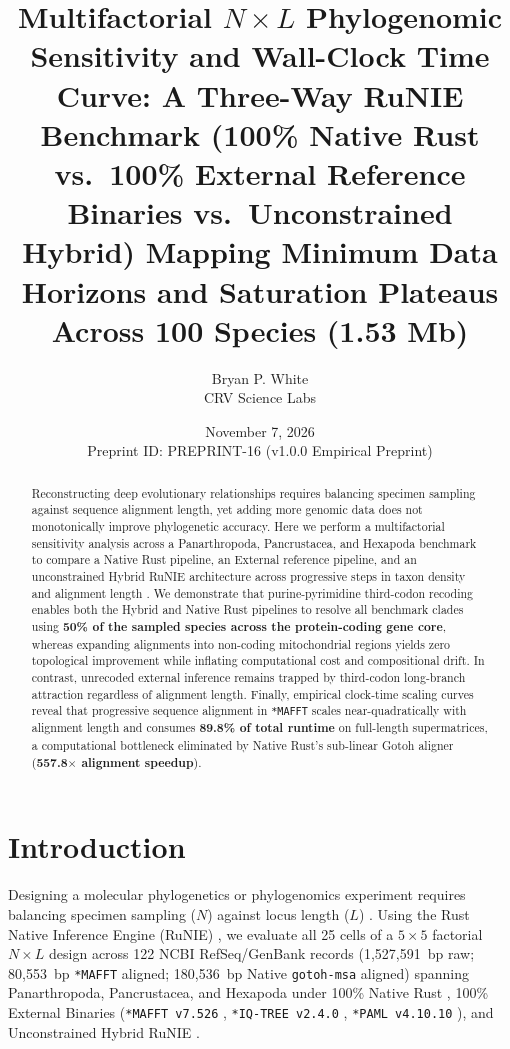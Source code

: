 \documentclass[10pt,letterpaper]{article}
\title{\textbf{Multifactorial $N \times L$ Phylogenomic Sensitivity and Wall-Clock Time Curve: A Three-Way RuNIE Benchmark (100\% Native Rust vs.\ 100\% External Reference Binaries vs.\ Unconstrained Hybrid) Mapping Minimum Data Horizons and Saturation Plateaus Across 100 Species (1.53 Mb)}}
\author{Bryan P. White \\ CRV Science Labs}
\date{November 7, 2026 \\ \small Preprint ID: PREPRINT-16 (v1.0.0 Empirical Preprint)}
\begin{document}
\maketitle

\begin{abstract}
Reconstructing deep evolutionary relationships requires balancing specimen sampling against sequence alignment length, yet adding more genomic data does not monotonically improve phylogenetic accuracy. Here we perform a multifactorial sensitivity analysis across a Panarthropoda, Pancrustacea, and Hexapoda benchmark to compare a Native Rust pipeline, an External reference pipeline, and an unconstrained Hybrid RuNIE architecture across progressive steps in taxon density and alignment length \cite{White2026RuNIE,White2026Pancrustacea}. We demonstrate that purine-pyrimidine third-codon recoding enables both the Hybrid and Native Rust pipelines to resolve all benchmark clades using \textbf{50\% of the sampled species across the protein-coding gene core}, whereas expanding alignments into non-coding mitochondrial regions yields zero topological improvement while inflating computational cost and compositional drift. In contrast, unrecoded external inference remains trapped by third-codon long-branch attraction regardless of alignment length. Finally, empirical clock-time scaling curves reveal that progressive sequence alignment in \texttt{*MAFFT} scales near-quadratically with alignment length and consumes \textbf{89.8\% of total runtime} on full-length supermatrices, a computational bottleneck eliminated by Native Rust's sub-linear Gotoh aligner (\textbf{557.8$\times$ alignment speedup}).
\end{abstract}

\section{Introduction}
Designing a molecular phylogenetics or phylogenomics experiment requires balancing specimen sampling ($N$) against locus length ($L$) \cite{Wortley2005,Philippe2011,Rokas2003,Nabhan2012}. Using the Rust Native Inference Engine (RuNIE) \cite{White2026RuNIE,White2026Pancrustacea}, we evaluate all 25 cells of a $5 \times 5$ factorial $N \times L$ design across 122 NCBI RefSeq/GenBank records (1,527,591~bp raw; 80,553~bp \texttt{*MAFFT} aligned; 180,536~bp Native \texttt{gotoh-msa} aligned) spanning Panarthropoda, Pancrustacea, and Hexapoda \cite{Misof2014,Schwentner2017,LozanoFernandez2016,LozanoFernandez2019,Regier2010} under 100\% Native Rust \cite{Gotoh1982,Felsenstein1981}, 100\% External Binaries (\texttt{*MAFFT v7.526} \cite{Katoh2013}, \texttt{*IQ-TREE v2.4.0} \cite{Minh2020,Kalyaanamoorthy2017}, \texttt{*PAML v4.10.10} \cite{Yang2007}), and Unconstrained Hybrid RuNIE \cite{Phillips2004}.
\end{document}
